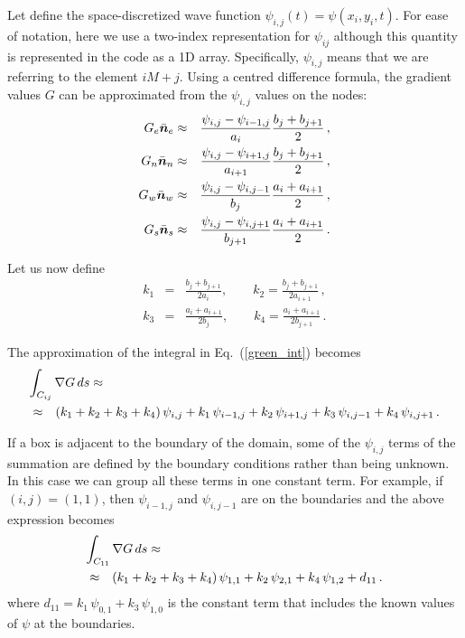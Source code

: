 \documentclass[a4paper,11pt]{article}
\newcommand{\ve}[1]{\mbox{\boldmath $ #1$}}
\begin{document}
Let define the space-discretized wave function $\psi_{i,j}(t) = \psi(x_i, y_i, t)$.
For ease of notation, here we use a two-index representation for $\psi_{ij}$ although this quantity is
represented in the code as a 1D array.  Specifically, $\psi_{i,j}$ means that we are referring to the element ${iM+j}$.
Using a centred difference formula, the gradient values $G$ can be approximated from the $\psi_{i,j}$ values on the nodes: 
\begin{eqnarray}
G_e \bar{\ve n}_e & \approx & \frac{\psi_{i,j}-\psi_{i-1,j}}{a_i} \frac{b_j+b_{j+1}}{2} \, ,      \\ \nonumber
G_n \bar{\ve n}_n & \approx & \frac{\psi_{i,j}-\psi_{i+1,j}}{a_{i+1}} \frac{b_j+b_{j+1}}{2} \, ,  \\ \nonumber
G_w \bar{\ve n}_w & \approx & \frac{\psi_{i,j}-\psi_{i,j-1}}{b_j} \frac{a_i+a_{i+1}}{2} \, ,      \\ \nonumber
G_s \bar{\ve n}_s & \approx & \frac{\psi_{i,j}-\psi_{i,j+1}}{b_{j+1}} \frac{a_i+a_{i+1}}{2} \, .     \nonumber
\end{eqnarray}

Let us now define
\begin{eqnarray}
k_1 &=& \frac{b_j+b_{j+1}}{2a_i}, \qquad k_2 = \frac{b_j+b_{j+1}}{2a_{i+1}}  \, ,      \\ \nonumber
k_3 &=& \frac{a_i+a_{i+1}}{2b_j}, \qquad k_4 = \frac{a_i+a_{i+1}}{2b_{j+1}}  \, .     \nonumber
\end{eqnarray}

The approximation of the integral in Eq.~(\ref{green_int}) becomes
\begin{eqnarray}
\lefteqn{\int_{C_{ij}} \nabla G \, ds \approx}   \\ \nonumber
& \approx &   (k_1+k_2+k_3+k_4) \, \psi_{i, j} + 
k_1 \, \psi_{i-1,j} + k_2 \, \psi_{i+1,j} + k_3 \, \psi_{i,j-1} + k_4 \, \psi_{i,j+1} \, .
\end{eqnarray}

If a box is adjacent to the boundary of the domain, some of the $\psi_{i,j}$ terms of the summation are defined by the boundary conditions rather than being unknown.  In this case we can group all these terms in one constant term.
For example, if $(i, j) = (1, 1)$, then $\psi_{i-1,j}$ and $\psi_{i,j-1}$ are on the boundaries and the above expression becomes
\begin{eqnarray}
\lefteqn{\int_{C_{11}} \nabla G \, ds \approx}   \\ \nonumber
& \approx &   (k_1+k_2+k_3+k_4) \, \psi_{1,1} + 
k_2 \, \psi_{2,1} + k_4 \, \psi_{1,2} + d_{11} \, .
\end{eqnarray}
where $d_{11} = k_1 \, \psi_{0,1} + k_3 \, \psi_{1,0}$ is the constant term that includes the known
values of $\psi$ at the boundaries.
\end{document}
